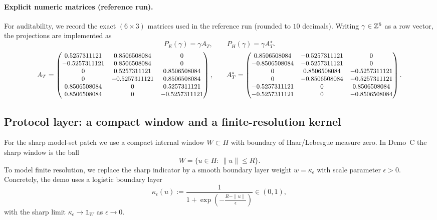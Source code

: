 \paragraph{Explicit numeric matrices (reference run).}
For auditability, we record the exact $(6\times 3)$ matrices used in the reference run (rounded to $10$ decimals). Writing $\gamma\in\mathbb{Z}^6$ as a row vector, the projections are implemented as
\[
P_E(\gamma)=\gamma A_T,\qquad P_H(\gamma)=\gamma A_T^\star.
\]
\[
\small
A_T=
\begin{pmatrix}
 0.5257311121 &  0.8506508084 &  0 \\
-0.5257311121 &  0.8506508084 &  0 \\
 0 &  0.5257311121 &  0.8506508084 \\
 0 & -0.5257311121 &  0.8506508084 \\
 0.8506508084 &  0 &  0.5257311121 \\
 0.8506508084 &  0 & -0.5257311121
\end{pmatrix},
\qquad
A_T^\star=
\begin{pmatrix}
 0.8506508084 & -0.5257311121 &  0 \\
-0.8506508084 & -0.5257311121 &  0 \\
 0 &  0.8506508084 & -0.5257311121 \\
 0 & -0.8506508084 & -0.5257311121 \\
-0.5257311121 &  0 &  0.8506508084 \\
-0.5257311121 &  0 & -0.8506508084
\end{pmatrix}.
\normalsize
\]

\subsection{Protocol layer: a compact window and a finite-resolution kernel}
For the sharp model-set patch we use a compact internal window $W\subset H$ with boundary of Haar/Lebesgue measure zero. In Demo~C the sharp window is the ball
\[
W=\{u\in H:\ \|u\|\le R\}.
\]
To model finite resolution, we replace the sharp indicator by a smooth boundary layer weight $w=\kappa_\epsilon$ with scale parameter $\epsilon>0$. Concretely, the demo uses a logistic boundary layer
\[
\kappa_\epsilon(u):=\frac{1}{1+\exp\!\left(-\frac{R-\|u\|}{\epsilon}\right)}\in(0,1),
\]
with the sharp limit $\kappa_\epsilon\to\mathds{1}_W$ as $\epsilon\to 0$.

